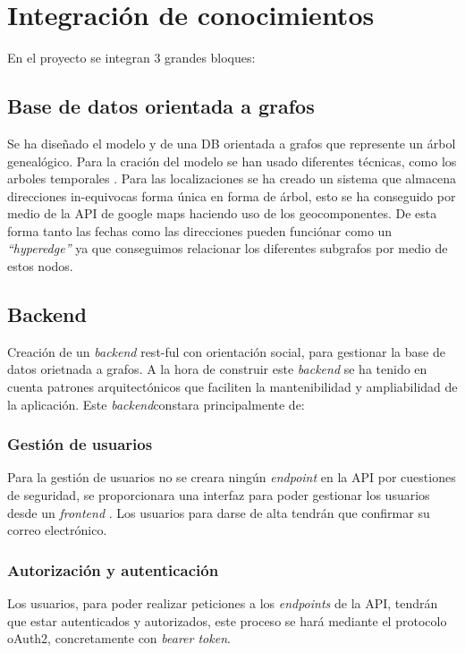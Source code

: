 \documentclass[12pt]{article} %
\begin{document}
\section{Integración de conocimientos}
En el proyecto se integran 3 grandes bloques:

\subsection{Base de datos orientada a grafos}
Se ha diseñado el modelo y de una DB orientada a grafos que represente un árbol genealógico. 
Para la cración del modelo se han usado diferentes técnicas, como los arboles temporales \cite{graphdbbook}. Para las localizaciones se ha creado un sistema que almacena direcciones in-equivocas forma única en forma de árbol, esto se ha conseguido por medio de la API de google maps haciendo uso de los geocomponentes. De esta forma tanto las fechas como las direcciones pueden funciónar como un \textit{``hyperedge''} ya que conseguimos relacionar los diferentes subgrafos por medio de estos nodos.

\subsection{Backend} Creación de un \textit{backend} rest-ful con orientación social, para gestionar la base de datos orietnada a grafos. A la hora de construir este \textit{backend} se ha tenido en cuenta patrones arquitectónicos que faciliten la mantenibilidad y ampliabilidad de la aplicación. Este \textit{backend}constara principalmente de:

\subsubsection*{Gestión de usuarios}
Para la gestión de usuarios no se creara ningún \textit{endpoint} en la API por cuestiones de seguridad, se proporcionara una interfaz para poder gestionar los usuarios desde un \textit{frontend }. Los usuarios para darse de alta tendrán que confirmar su correo electrónico.

\subsubsection*{Autorización y autenticación}
Los usuarios, para poder realizar peticiones a los \textit{endpoints} de la API, tendrán que estar autenticados y autorizados, este proceso se hará mediante el protocolo oAuth2, concretamente con \textit{bearer token}.
\end{document}
